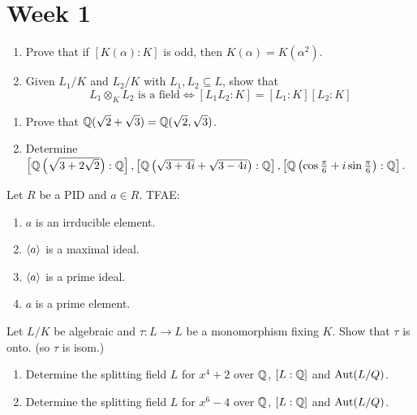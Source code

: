 
\section{Week 1}

\begin{exercise} \mbox{}
  \begin{enumerate}
    \item Prove that if $[K(\alpha) : K]$ is odd, then
      $K(\alpha) = K(\alpha^2)$.
    \item Given $L_1/K$ and $L_2/K$ with $L_1, L_2 \subseteq L$, show that
      \[
        L_1 \otimes_K L_2 \text{~is a field} \iff
        [L_1L_2 : K] = [L_1 : K][L_2 : K]
      \]
  \end{enumerate}
\end{exercise}

\begin{exercise} \mbox{}
  \begin{enumerate}
    \item Prove that $\mathbb{Q}(\sqrt{2} + \sqrt{3}) = \mathbb{Q}(\sqrt{2}, \sqrt{3})$.
    \item Determine $\left[\mathbb{Q}\left(\sqrt{3 + 2\sqrt{2}}\right): \mathbb{Q}\right],
      \left[\mathbb{Q}\left(\sqrt{3 + 4i} + \sqrt{3 - 4i}\right): \mathbb{Q}\right],
      \left[\mathbb{Q}\left(\cos \frac{\pi}{6} + i \sin \frac{\pi}{6}\right): \mathbb{Q}\right]$.
  \end{enumerate}
\end{exercise}

\begin{exercise}
  Let $R$ be a PID and $a \in R$. TFAE:
  \begin{enumerate}
    \item $a$ is an irrducible element.
    \item $\langle a\rangle$ is a maximal ideal.
    \item $\langle a\rangle$ is a prime ideal.
    \item $a$ is a prime element.
  \end{enumerate}
\end{exercise}

\begin{exercise}
  Let $L/K$ be algebraic and $\tau: L \to L$ be a monomorphism fixing $K$.
  Show that $\tau$ is onto. (so $\tau$ is isom.)
\end{exercise}

\begin{exercise} \mbox{}
  \begin{enumerate}
    \item Determine the splitting field $L$ for $x^4 + 2$ over $\mathbb{Q}$,
      $[L : \mathbb{Q}]$ and $\operatorname{Aut}(L/Q)$.
    \item Determine the splitting field $L$ for $x^6 - 4$ over $\mathbb{Q}$,
      $[L : \mathbb{Q}]$ and $\operatorname{Aut}(L/Q)$.
  \end{enumerate}
\end{exercise}

